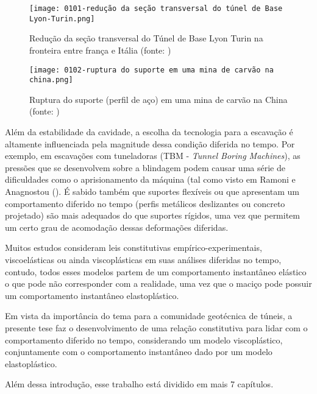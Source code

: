 \begin{figure}[H]
	\begin{center}
		\texttt{[image: 0101-redução da seção transversal do túnel de Base Lyon-Turin.png]}
	\end{center}
	\caption{\label{redução_base_turin}Redução da seção transversal do Túnel de Base Lyon Turin na fronteira entre frança e Itália (fonte: )}
\end{figure}

\begin{figure}[H]
	\begin{center}
		\texttt{[image: 0102-ruptura do suporte em uma mina de carvão na china.png]}
	\end{center}
	\caption{\label{ruptura_china}Ruptura do suporte (perfil de aço) em uma mina de carvão na China (fonte: )}
\end{figure}
 
Além da estabilidade da cavidade, a escolha da tecnologia para a escavação é altamente influenciada pela magnitude dessa condição diferida no tempo. Por exemplo, em escavações com tuneladoras (TBM - \textit{Tunnel Boring Machines}), as pressões que se desenvolvem sobre a blindagem podem causar uma série de dificuldades como o aprisionamento da máquina (tal como visto em Ramoni e Anagnostou (\citeyear{Ramoni2010a,Ramoni2010b}). É sabido também que suportes flexíveis ou que apresentam um comportamento diferido no tempo (perfis metálicos deslizantes ou concreto projetado) são mais adequados do que suportes rígidos, uma vez que permitem um certo grau de acomodação dessas deformações diferidas.

Muitos estudos consideram leis constitutivas empírico-experimentais, viscoelásticas ou ainda viscoplásticas em suas análises diferidas no tempo, contudo, todos esses modelos partem de um comportamento instantâneo elástico o que pode não corresponder com a realidade, uma vez que o maciço pode possuir um comportamento instantâneo elastoplástico.

Em vista da importância do tema para a comunidade geotécnica de túneis, a presente tese faz o desenvolvimento de uma relação constitutiva para lidar com o comportamento diferido no tempo, considerando um modelo viscoplástico, conjuntamente com o comportamento instantâneo dado por um modelo elastoplástico. 

Além dessa introdução, esse trabalho está dividido em mais 7 capítulos.

